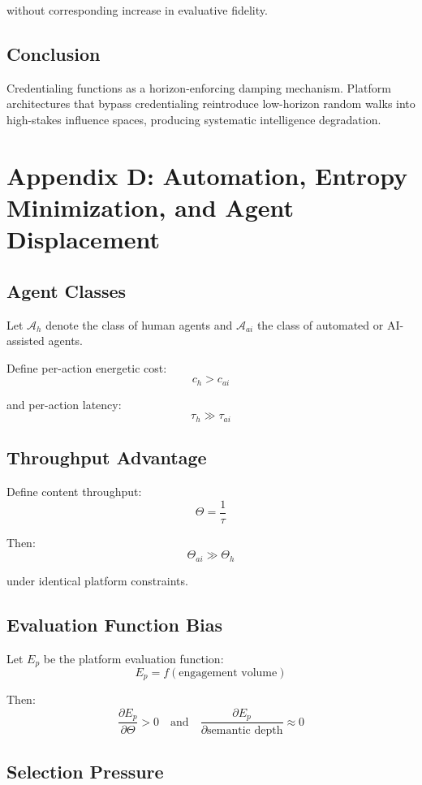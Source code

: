 \documentclass[12pt]{article}
\begin{document}
without corresponding increase in evaluative fidelity.

\subsection{Conclusion}

Credentialing functions as a horizon-enforcing damping mechanism.
Platform architectures that bypass credentialing reintroduce low-horizon
random walks into high-stakes influence spaces, producing systematic
intelligence degradation.

\section{Appendix D: Automation, Entropy Minimization, and Agent Displacement}

\subsection{Agent Classes}

Let $\mathcal{A}_h$ denote the class of human agents and $\mathcal{A}_{ai}$ the class of automated or AI-assisted agents.

Define per-action energetic cost:
\[
c_h > c_{ai}
\]

and per-action latency:
\[
\tau_h \gg \tau_{ai}
\]

\subsection{Throughput Advantage}

Define content throughput:
\[
\Theta = \frac{1}{\tau}
\]

Then:
\[
\Theta_{ai} \gg \Theta_h
\]

under identical platform constraints.

\subsection{Evaluation Function Bias}

Let $E_p$ be the platform evaluation function:
\[
E_p = f(\text{engagement volume})
\]

Then:
\[
\frac{\partial E_p}{\partial \Theta} > 0
\quad\text{and}\quad
\frac{\partial E_p}{\partial \text{semantic depth}} \approx 0
\]

\subsection{Selection Pressure}
\end{document}
